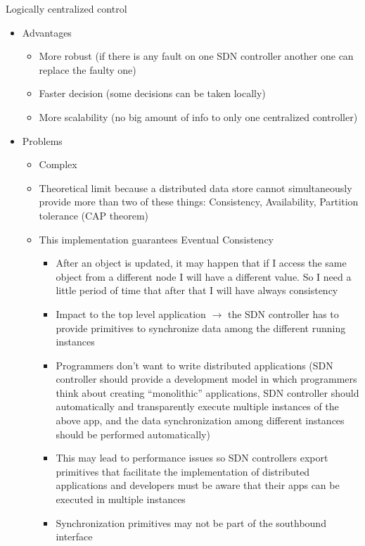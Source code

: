 \documentclass{article}
\begin{document}
Logically centralized control
  \begin{itemize}
    \item Advantages
      \begin{itemize}
        \item More robust (if there is any fault on one SDN controller another one can replace the faulty one)
        \item Faster decision (some decisions can be taken locally)
        \item More scalability (no big amount of info to only one centralized controller)
      \end{itemize}
    \item Problems
      \begin{itemize}
        \item Complex
        \item Theoretical limit because a distributed data store cannot simultaneously provide more than two of these things: Consistency, Availability, Partition tolerance (CAP theorem)
        \item This implementation guarantees Eventual Consistency
          \begin{itemize}
            \item After an object is updated, it may happen that if I access the same object from a different node I will have a different value. So I need a little period of time that after that I will have always consistency
            \item Impact to the top level application $\rightarrow$ the SDN controller has to provide primitives to synchronize data among the different running instances
            \item Programmers don’t want to write distributed applications (SDN controller should provide a development model in which programmers think about creating “monolithic” applications, SDN controller should automatically and transparently execute multiple instances of the above app, and the data synchronization among different instances should be performed automatically)
            \item This may lead to performance issues so SDN controllers export primitives that facilitate the implementation of distributed applications and developers must be aware that their apps can be executed in multiple instances
            \item Synchronization primitives may not be part of the southbound interface
          \end{itemize}
      \end{itemize}
  \end{itemize}
\end{document}
